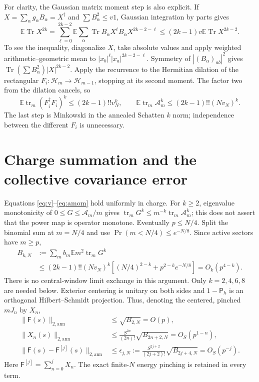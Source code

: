 \documentclass[11pt,a4paper]{article}
\newcommand{\EE}{\mathbb E}
\newcommand{\tr}{\operatorname{tr}}
\newcommand{\PP}{\mathsf P_h}
\newcommand{\FF}{\mathsf F}
\begin{document}
For clarity, the Gaussian matrix moment step is also explicit.
If $X=\sum_\alpha g_\alpha B_\alpha=X^\dagger$ and
$\sum B_\alpha^2\leq v1$, Gaussian integration by parts gives
\begin{equation}
 \EE\operatorname{Tr}X^{2k}
 =\sum_{\ell=0}^{2k-2}\EE\sum_\alpha
 \operatorname{Tr}B_\alpha X^\ell B_\alpha X^{2k-2-\ell}
 \leq(2k-1)v\EE\operatorname{Tr}X^{2k-2}.
\end{equation}
To see the inequality, diagonalize $X$, take absolute values and
apply weighted arithmetic--geometric mean to
$|x_b|^\ell|x_a|^{2k-2-\ell}$. Symmetry of
$|(B_\alpha)_{ab}|^2$ gives
$\operatorname{Tr}(\sum B_\alpha^2)|X|^{2k-2}$.
Apply the recurrence to the Hermitian dilation of the rectangular
$F_i:\mathcal H_m\to\mathcal H_{m-1}$, stopping at its second moment.
The factor two from the dilation cancels, so
\begin{equation}
 \EE\tr_m(F_i^\dagger F_i)^k\leq(2k-1)!!v_N^k,
 \qquad \EE\tr_m\mathcal A_m^k\leq(2k-1)!!(Nv_N)^k.\label{eq:amom}
\end{equation}
The last step is Minkowski in the annealed Schatten $k$ norm;
independence between the different $F_i$ is unnecessary.

\newpage
\section{Charge summation and the collective covariance error}
Equations \eqref{eq:v}--\eqref{eq:amom} hold uniformly in charge.
For $k\geq2$, eigenvalue monotonicity of $0\leq G\leq\mathcal A_m/m$
gives $\tr_mG^k\leq m^{-k}\tr_m\mathcal A_m^k$; this does not
assert that the power map is operator monotone. Eventually $p\leq N/4$.
Split the binomial sum at $m=N/4$ and use
$\Pr(m<N/4)\leq e^{-N/8}$. Since active sectors have $m\geq p$,
\begin{align}
 B_{k,N}&:=\sum_m b_m\EE m^2\tr_mG^k\\
 &\leq(2k-1)!!(Nv_N)^k
 \left[(N/4)^{2-k}+p^{2-k}e^{-N/8}\right]
 =O_k(p^{4-k}).\label{eq:weighted}
\end{align}
There is no central-window limit exchange in this argument.
Only $k=2,4,6,8$ are needed below. Exterior centering is unitary
on both sides and $1-\PP$ is an orthogonal Hilbert--Schmidt
projection. Thus, denoting the centered, pinched $mJ_n$ by $X_n$,
\begin{align}
 \|\FF(s)\|_{2,\mathrm{ann}}&\leq\sqrt{B_{2,N}}=O(p),\\
 \|X_n(s)\|_{2,\mathrm{ann}}&\leq
 \frac{S^{2n}}{(2n)!}\sqrt{B_{2n+2,N}}=O_S(p^{1-n}),\\
 \|\FF(s)-\FF^{[j]}(s)\|_{2,\mathrm{ann}}&\leq
 \epsilon_{j,N}:=\frac{S^{2j+2}}{(2j+2)!}\sqrt{B_{2j+4,N}}
 =O_S(p^{-j}).\label{eq:scaled}
\end{align}
Here $\FF^{[j]}=\sum_{n=0}^jX_n$. The exact finite-$N$ energy
pinching is retained in every term.
\end{document}
